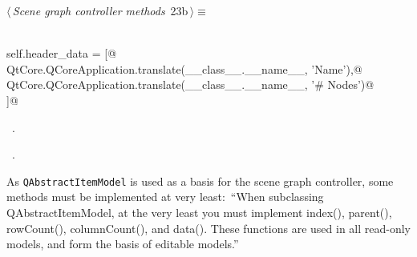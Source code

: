 \documentclass[
    a4paper,      %
    10pt,         %
    openright,    %
    notitlepage,  %
    parskip=half, %
]{scrreprt}       %
\theoremstyle{definition}                    %
\begin{document}
\begin{flushleft} \small
\begin{minipage}{\linewidth}\label{scrap18}\raggedright\small
{} $\langle\,${\itshape Scene graph controller methods}\nobreak\ {\footnotesize {23b}}$\,\rangle\equiv$
\vspace{-1ex}
\begin{list}{}{} \item
\mbox{}\lstinline@@\\
\mbox{}\lstinline@    self.header_data = [@\\
\mbox{}\lstinline@        QtCore.QCoreApplication.translate(__class__.__name__, 'Name'),@\\
\mbox{}\lstinline@        QtCore.QCoreApplication.translate(__class__.__name__, '# Nodes')@\\
\mbox{}\lstinline@    ]@\\
\mbox{}\lstinline@@{\NWsep}
\end{list}
\vspace{-1.5ex}
\footnotesize
\begin{list}{}{\setlength{\itemsep}{-\parsep}\setlength{\itemindent}{-\leftmargin}}
\item \NWtxtMacroDefBy\ .
\item \NWtxtMacroRefIn\ .

\item{}
\end{list}
\end{minipage}\vspace{4ex}
\end{flushleft}

As \verb+QAbstractItemModel+ is used as a basis for the scene graph controller,
some methods must be implemented at very least:~\enquote{When subclassing
QAbstractItemModel, at the very least you must implement index(), parent(),
rowCount(), columnCount(), and data(). These functions are used in all read-only
models, and form the basis of editable
models.}
\end{document}
